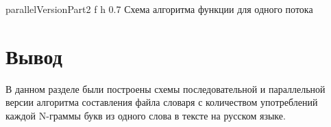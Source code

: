 {parallelVersionPart2} %
{f} %
{h} %
{0.7\textwidth} %
{Схема алгоритма функции для одного потока} %


\clearpage

\section*{Вывод}

В данном разделе были построены схемы последовательной и параллельной версии алгоритма составления файла словаря с количеством употреблений каждой N-граммы букв из одного слова в тексте на русском языке.



